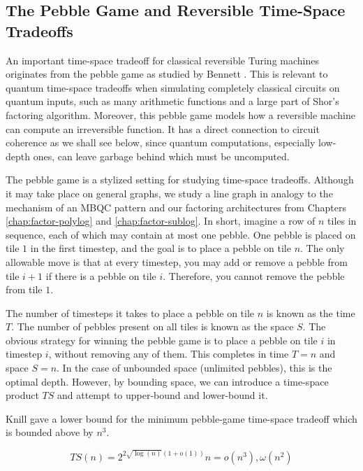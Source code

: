 \subsection{The Pebble Game and Reversible Time-Space Tradeoffs}
\label{subsec:cohere-pebble}

An important time-space tradeoff for classical reversible Turing machines
originates from the pebble game as studied by Bennett \cite{Bennett1973}.
This is relevant to quantum time-space tradeoffs when simulating
completely classical circuits on quantum inputs, such as many arithmetic
functions and a large part of Shor's factoring algorithm. Moreover, this
pebble game models how a reversible machine can compute an irreversible
function. It has a direct connection to circuit coherence as we shall see
below, since quantum computations, especially low-depth ones, can leave
garbage behind which must be uncomputed.

The pebble game is a stylized setting for studying time-space tradeoffs.
Although it may take place on general graphs, we study a line graph
in analogy to the mechanism of an MBQC pattern and our factoring architectures
from Chapters \ref{chap:factor-polylog} and \ref{chap:factor-sublog}.
In short, imagine a row of $n$ tiles in sequence, each of which may
contain at most one pebble. One pebble is placed
on tile $1$ in the first timestep, and the goal is to place a pebble
on tile $n$. The only allowable move is that at every timestep,
you may add or remove a pebble from tile $i+1$ if there is a pebble on
tile $i$. Therefore, you cannot remove the pebble from tile $1$.

The number of timesteps it takes to place a pebble on tile $n$ is known
as the time $T$. The number of pebbles present on all tiles is known
as the space $S$. The obvious strategy for winning the pebble game is
to place a pebble on tile $i$ in timestep $i$, without removing any of them.
This completes in time $T=n$ and space $S = n$. In the case of unbounded
space (unlimited pebbles), this is the optimal depth. However, by
bounding space, we can introduce a time-space product $TS$ and attempt to
upper-bound and lower-bound it.

Knill gave a lower bound for the minimum pebble-game time-space tradeoff
\cite{Knill1995} which is bounded above by $n^3$.

\begin{equation}
TS(n) = 2^{2\sqrt{\log(n)}(1 + o(1))}n = o(n^3), \omega(n^2)
\end{equation}

